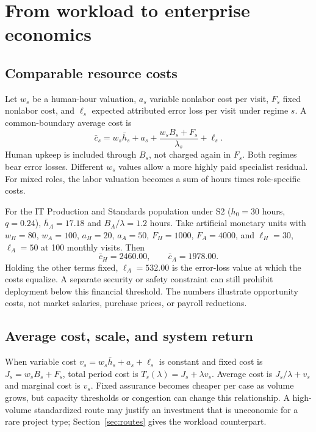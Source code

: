 \section{From workload to enterprise economics}
\label{sec:economics}

\subsection{Comparable resource costs}

Let $w_s$ be a human-hour valuation, $a_s$ variable nonlabor cost per visit, $F_s$ fixed nonlabor
cost, and $\ell_s$ expected attributed error loss per visit under regime $s$. A common-boundary
average cost is
\begin{equation}
\bar c_s = w_s\bar h_s + a_s + \frac{w_sB_s+F_s}{\lambda_s} + \ell_s. \label{eq:avgcost}
\end{equation}
Human upkeep is included through $B_s$, not charged again in $F_s$. Both regimes bear error losses.
Different $w_s$ values allow a more highly paid specialist residual. For mixed roles, the labor
valuation becomes a sum of hours times role-specific costs.

For the IT Production and Standards population under S2 ($h_0=30$ hours, $q=0.24$), $\bar h_A=17.18$
and $B_A/\lambda=1.2$ hours. Take artificial monetary
units with $w_H=80$, $w_A=100$, $a_H=20$, $a_A=50$, $F_H=1000$, $F_A=4000$, and $\ell_H=30$,
$\ell_A=50$ at 100 monthly visits. Then
\begin{equation}
\bar c_H = 2460.00, \qquad \bar c_A = 1978.00. \label{eq:costexample}
\end{equation}
Holding the other terms fixed, $\ell_A=532.00$ is the error-loss value at which the costs equalize. A
separate security or safety constraint can still prohibit deployment below this financial threshold.
The numbers illustrate opportunity costs, not market salaries, purchase prices, or payroll reductions.

\subsection{Average cost, scale, and system return}

When variable cost $v_s=w_s\bar h_s+a_s+\ell_s$ is constant and fixed cost is $J_s=w_sB_s+F_s$, total
period cost is $T_s(\lambda)=J_s+\lambda v_s$. Average cost is $J_s/\lambda+v_s$ and marginal cost is
$v_s$. Fixed assurance becomes cheaper per case as volume grows, but capacity thresholds or
congestion can change this relationship. A high-volume standardized route may justify an investment
that is uneconomic for a rare project type; Section~\ref{sec:routes} gives the workload counterpart.

